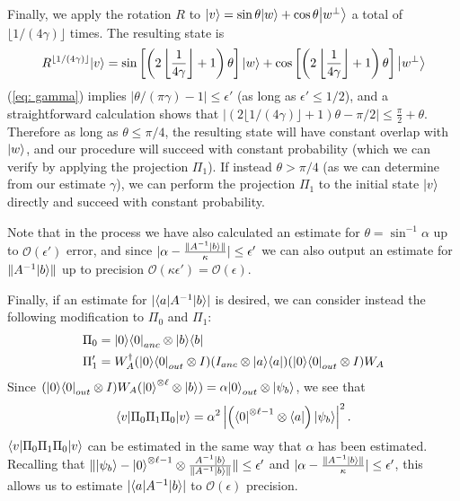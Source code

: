 \documentclass[11pt]{article}
\theoremstyle{definition}
\theoremstyle{remark}
\theoremstyle{definition}
\newcommand\bigoh{\mathcal{O}}
\begin{document}
Finally, we apply the rotation $R$ to ${\left\vert{v}\right\rangle} = \sin \theta {\left\vert{w}\right\rangle} +\cos \theta{\left\vert{w^\perp}\right\rangle}$ a total of $\lfloor1/(4\gamma)\rfloor$ times. The resulting state is
\begin{equation}
R^{\lfloor1/(4\gamma)\rfloor}{\left\vert{v}\right\rangle} = \sin\left[\left(2\left\lfloor\frac{1}{4\gamma}\right\rfloor+1\right)\theta\right] {\left\vert{w}\right\rangle} + \cos\left[\left(2\left\lfloor\frac{1}{4\gamma}\right\rfloor+1\right)\theta\right] {\left\vert{w^\perp}\right\rangle}
\end{equation}
(\ref{eq: gamma}) implies $|\theta/(\pi\gamma) - 1| \le \epsilon'$ (as long as $\epsilon' \le 1/2$), and a straightforward calculation shows that $|(2\lfloor1/(4\gamma)\rfloor+1) \theta - \pi/2| \le \frac{\pi}{2}+\theta$. Therefore as long as $\theta \le \pi/4$, the resulting state will have constant overlap with ${\left\vert{w}\right\rangle}$, and our procedure will succeed with constant probability (which we can verify by applying the projection $\Pi_1$). If instead $\theta > \pi/4$ (as we can determine from our estimate $\gamma$), we can perform the projection $\Pi_1$ to the initial state ${\left\vert{v}\right\rangle}$ directly and succeed with constant probability.

Note that in the process we have also calculated an estimate for $\theta = \sin^{-1}\alpha$ up to $\bigoh(\epsilon')$ error, and since $|\alpha - \frac{\|A^{-1}{\left\vert{b}\right\rangle}\|}{\kappa}| \le \epsilon'$ we can also output an estimate for $\|A^{-1}{\left\vert{b}\right\rangle}\|$ up to precision $\mathcal{O}(\kappa \epsilon') = \mathcal{O}(\epsilon)$.

Finally, if an estimate for $|{\left\langle{a}\right\vert} A^{-1} {\left\vert{b}\right\rangle}|$ is desired, we can consider instead the following modification to $\Pi_0$ and $\Pi_1$:
\begin{align}
\Pi_0 &= {\left\vert{0}\right\rangle}{\left\langle{0}\right\vert}_{anc} \otimes {\left\vert{b}\right\rangle}{\left\langle{b}\right\vert} \\
\Pi'_1 &= W_A^\dagger ({\left\vert{0}\right\rangle}{\left\langle{0}\right\vert}_{out} \otimes I) (I_{anc} \otimes {\left\vert{a}\right\rangle}{\left\langle{a}\right\vert})({\left\vert{0}\right\rangle}{\left\langle{0}\right\vert}_{out} \otimes I) W_A
\end{align}
Since $({\left\vert{0}\right\rangle}{\left\langle{0}\right\vert}_{out} \otimes I) W_A ({\left\vert{0}\right\rangle}^{\otimes \ell} \otimes {\left\vert{b}\right\rangle}) = \alpha {\left\vert{0}\right\rangle}_{out} \otimes {\left\vert{\psi_b}\right\rangle}$, we see that 
\begin{equation}
{\left\langle{v}\right\vert}\Pi_0\Pi_1\Pi_0{\left\vert{v}\right\rangle} = \alpha^2\left|\left({\left\langle{0}\right\vert}^{\otimes \ell-1} \otimes {\left\langle{a}\right\vert}\right) {\left\vert{\psi_b}\right\rangle}\right|^2.
\end{equation}
${\left\langle{v}\right\vert}\Pi_0\Pi_1\Pi_0{\left\vert{v}\right\rangle}$ can be estimated in the same way that $\alpha$ has been estimated. Recalling that $\| {\left\vert{\psi_b}\right\rangle} - {\left\vert{0}\right\rangle}^{\otimes \ell-1} \otimes \frac{A^{-1}{\left\vert{b}\right\rangle}} {\|A^{-1}{\left\vert{b}\right\rangle}\|} \| \le \epsilon'$ and $|\alpha - \frac{\|A^{-1}{\left\vert{b}\right\rangle}\|}{\kappa}| \le \epsilon'$, this allows us to estimate $|{\left\langle{a}\right\vert} A^{-1} {\left\vert{b}\right\rangle}|$ to $\bigoh (\epsilon)$ precision.
\end{document}
